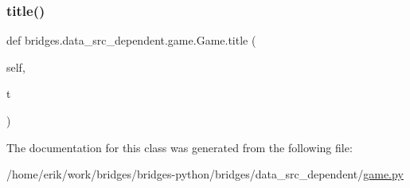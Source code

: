 \mbox{\label{classbridges_1_1data__src__dependent_1_1game_1_1_game_ae2b0f2f1bbbf2d11c669079b075c6ad1}} 
\subsubsection{\texorpdfstring{title()}{title()}\hspace{0.1cm}{\footnotesize\ttfamily [2/2]}}
{\footnotesize\ttfamily def bridges.\+data\+\_\+src\+\_\+dependent.\+game.\+Game.\+title (\begin{DoxyParamCaption}\item[{}]{self,  }\item[{}]{t }\end{DoxyParamCaption})}



The documentation for this class was generated from the following file\+:\begin{DoxyCompactItemize}
\item 
/home/erik/work/bridges/bridges-\/python/bridges/data\+\_\+src\+\_\+dependent/\hyperlink{game_8py}{game.\+py}\end{DoxyCompactItemize}
